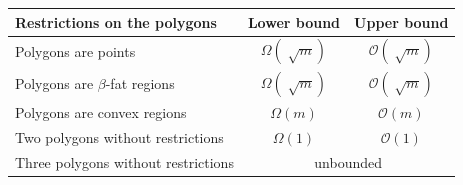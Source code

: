 \documentclass{paper}
\newtheorem{definition}{Definition}
\newtheorem{lemma}{Lemma}
\newcommand{\mremark}[3]{\textcolor{blue}{\textsc{#1 #2:}} \textcolor{SeaGreen}{\textsf{#3}}}
\newcommand{\jerome}[2][says]{\mremark{J\'er\^ome}{#1}{#2}}
\newcommand{\bigo}{\ensuremath{\mathcal O}}
\begin{document}









\begin{table}[H]
\begin{tabular}{lcc}
\toprule
Restrictions on the polygons & Lower bound & Upper bound  \\ \midrule
Polygons are points & $\Omega(\sqrt[]{m}) $ & $\bigo(\sqrt[]{m})$ \\
Polygons are $\beta$-fat regions & $\Omega(\sqrt[]{m}) $ & $\bigo(\sqrt[]{m})$ \\
Polygons are convex regions & $\Omega(m) $ & $\bigo(m)$ \\
Two polygons without restrictions &  $\Omega(1)$ & $\bigo(1)$\\
Three polygons without restrictions &  \multicolumn{2}{c}{unbounded}\\
\bottomrule
\end{tabular}
\end{table}
\end{document}
